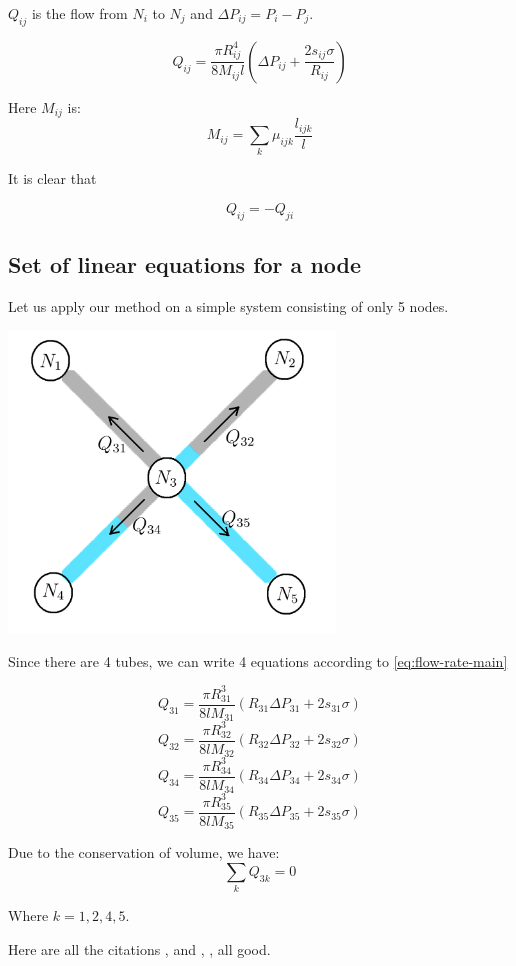 	$Q_{ij}$ is the flow from $N_i$ to $N_j$ and $\Delta P_{ij} = P_i - P_j$.
	
	\begin{equation} \label{eq:flow-rate-main}
		\boxed{Q_{ij} = \frac{\pi R_{ij}^4}{8M_{ij}l} \left(\Delta P_{ij} + \frac{2s_{ij}\sigma}{R_{ij}} \right)}
	\end{equation}
	
	Here $M_{ij}$ is:
	\[ {M}_{ij} = \sum_{k} {\mu}_{ijk} \frac{l_{ijk}}{l} \]
	 
	It is clear that

	\begin{equation}
		Q_{ij} = -Q_{ji}
	\end{equation}


\subsection{Set of linear equations for a node} \label{sec:linear-equ}

	Let us apply our method on a simple system consisting of only 5 nodes. 

	\includegraphics[height=8cm]{figures/fig_simple-5-nodes}

	Since there are 4 tubes, we can write 4 equations according to \ref{eq:flow-rate-main}
	
	\[ Q_{31} = \frac{\pi R_{31}^3}{8lM_{31}}(R_{31}\Delta P_{31} + 2s_{31}\sigma) \]
	\[ Q_{32} = \frac{\pi R_{32}^3}{8lM_{32}}(R_{32}\Delta P_{32} + 2s_{32}\sigma) \]
	\[ Q_{34} = \frac{\pi R_{34}^3}{8lM_{34}}(R_{34}\Delta P_{34} + 2s_{34}\sigma) \]
	\[ Q_{35} = \frac{\pi R_{35}^3}{8lM_{35}}(R_{35}\Delta P_{35} + 2s_{35}\sigma) \]

	Due to the conservation of volume, we have:
	\[ \sum_{k} Q_{3k} = 0 \]
	
	Where $k = {1, 2, 4, 5}$.
	
Here are all the citations \cite{aker1998two}, and \cite{raoof2010new}, \cite{sinha2017effective}, \cite{fatt1956network}	all good.
